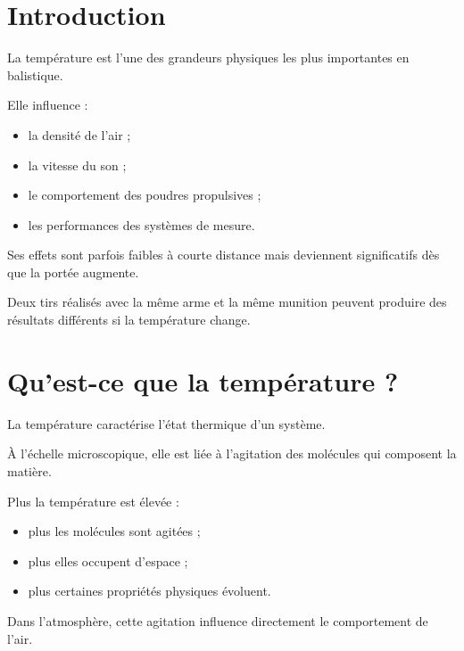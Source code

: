 
\section{Introduction}

La température est l'une des grandeurs physiques les plus importantes en
balistique.

Elle influence :

\begin{itemize}
\item la densité de l'air ;
\item la vitesse du son ;
\item le comportement des poudres propulsives ;
\item les performances des systèmes de mesure.
\end{itemize}

Ses effets sont parfois faibles à courte distance mais deviennent
significatifs dès que la portée augmente.

\begin{aretenir}

Deux tirs réalisés avec la même arme et la même munition peuvent produire des
résultats différents si la température change.

\end{aretenir}

\section{Qu'est-ce que la température ?}

La température caractérise l'état thermique d'un système.

À l'échelle microscopique, elle est liée à l'agitation des molécules qui
composent la matière.

Plus la température est élevée :

\begin{itemize}
\item plus les molécules sont agitées ;
\item plus elles occupent d'espace ;
\item plus certaines propriétés physiques évoluent.
\end{itemize}

Dans l'atmosphère, cette agitation influence directement le comportement de
l'air.

